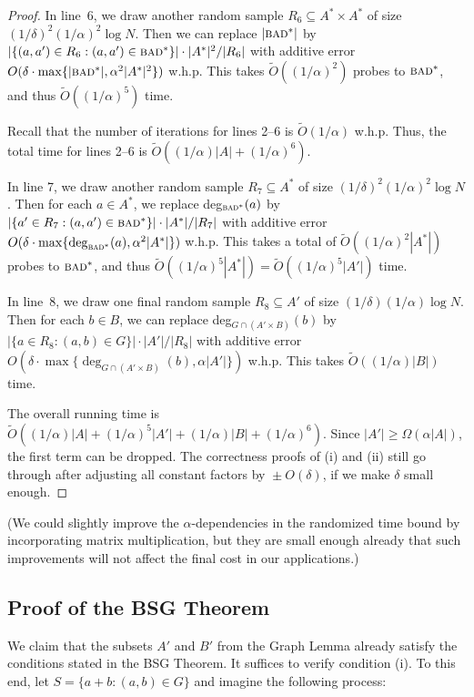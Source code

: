 \documentclass[11pt]{article}
\newcommand{\OO}{\widetilde{O}}
\begin{document}
{\begin{proof}
In line~6, we draw another random sample $R_6\subseteq A^*\times A^*$ of size $(1/\delta)^2(1/\alpha)^2 \log N$.
Then we can replace $|\textsc{bad}^*|$ by
$|\{(a,a')\in R_6: (a,a')\in \textsc{bad}^*\}| \cdot |A^*|^2/|R_6|$
with additive error $O(\delta\cdot \max\{|\textsc{bad}^*|, \alpha^2 |A^*|^2\})$ w.h.p.
This takes $\OO((1/\alpha)^2)$ probes to $\textsc{bad}^*$, and thus $\OO((1/\alpha)^5)$ time.

Recall that the number of iterations for lines 2--6 is $\OO(1/\alpha)$ w.h.p.
Thus, the total time for lines 2--6 is $\OO((1/\alpha) |A| + (1/\alpha)^6)$.

In line 7, we draw another random sample $R_7\subseteq A^*$ of size $(1/\delta)^2(1/\alpha)^2 \log N$.
Then for each $a \in A^*$, we replace
deg$_{\textsc{bad}^*}(a)$ by
$|\{a'\in R_7: (a,a')\in \textsc{bad}^*\}| \cdot |A^*|/|R_7|$
with additive error $O(\delta\cdot\max\{\deg_{\textsc{bad}^*}(a),\alpha^2 |A^*|\})$ w.h.p.
This takes a total of $\OO((1/\alpha)^2 |A^*|)$
probes to $\textsc{bad}^*$, and thus $\OO((1/\alpha)^5 |A^*|)
= \OO((1/\alpha)^5 |A'|)$ time.

In line~8,  we draw one final random sample $R_8\subseteq A'$ of size $(1/\delta)(1/\alpha) \log N$.
Then for each $b \in B$, we can replace deg$_{G\cap (A'\times B)}(b)$ by
$|\{a\in R_8: (a,b)\in G\}| \cdot |A'|/|R_8|$
with additive error $O(\delta\cdot\max\{\deg_{G\cap (A'\times B)}(b), \alpha |A'|\})$ w.h.p.
This takes $\OO((1/\alpha)|B|)$ time.


The overall running time is $\OO((1/\alpha)|A|  + (1/\alpha)^5 |A'| + (1/\alpha)|B| + (1/\alpha)^6)$.
Since $|A'| \geq  \Omega(\alpha |A|)$, the first term can
be dropped.
The correctness proofs of (i) and (ii) still go through
after adjusting all constant factors by ${} \pm O(\delta)$, if we make
$\delta$ small enough.
\end{proof}

(We could slightly improve the $\alpha$-dependencies in the randomized time bound by incorporating matrix multiplication,
but they are small enough already that such improvements will not affect the final cost in our applications.)



\subsection{Proof of the BSG Theorem}\label{sec-bsg-proof}




We claim that the subsets $A'$ and $B'$ from the Graph Lemma
already satisfy the conditions stated in the BSG Theorem.
It suffices to verify condition (i).
To this end, let $S=\{a+b : (a,b)\in G\}$ and imagine
the following process:

}
\end{document}
